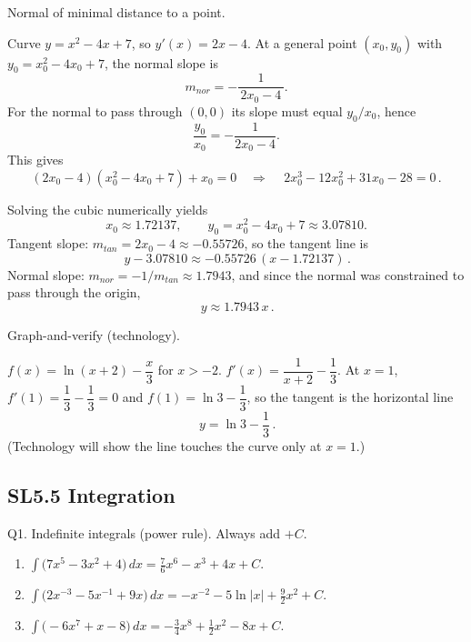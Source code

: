 \documentclass[11pt]{article}
\def\textbf#1{#1}%
\def\mathrm#1{#1}%
\newcommand{\tocsubsection}[1]{\subsection{#1}}
\begin{document}
\begin{solution}
\textbf{Normal of minimal distance to a point.}

Curve $y=x^2-4x+7$, so $y'(x)=2x-4$.  
At a general point $(x_0,y_0)$ with $y_0=x_0^2-4x_0+7$, the normal slope is
\[
m_{\mathrm{nor}}=-\frac{1}{\,2x_0-4\,}.
\]
For the normal to pass through $(0,0)$ its slope must equal $y_0/x_0$, hence
\[
\frac{y_0}{x_0}=-\frac{1}{2x_0-4}.
\]
This gives
\[
(2x_0-4)(x_0^2-4x_0+7)+x_0=0
\quad\Rightarrow\quad
\boxed{\,2x_0^3-12x_0^2+31x_0-28=0\,}.
\]

Solving the cubic numerically yields
\[
\boxed{x_0\approx 1.72137},\qquad
y_0=x_0^2-4x_0+7\approx \boxed{3.07810}.
\]
Tangent slope: $m_{\mathrm{tan}}=2x_0-4\approx -0.55726$, so the tangent line is
\[
\boxed{\,y-3.07810\approx -0.55726\,(x-1.72137)\,}.
\]
Normal slope: $m_{\mathrm{nor}}=-1/m_{\mathrm{tan}}\approx 1.7943$, and since the normal was constrained to pass through the origin,
\[
\boxed{\,y\approx 1.7943\,x\,}.
\]
\end{solution}

\begin{solution}
\textbf{Graph-and-verify (technology).}

$f(x)=\ln(x+2)-\dfrac{x}{3}$ for $x>-2$.  
$f'(x)=\dfrac{1}{x+2}-\dfrac{1}{3}$.  
At $x=1$, $f'(1)=\dfrac{1}{3}-\dfrac{1}{3}=0$ and $f(1)=\ln 3-\dfrac{1}{3}$,
so the tangent is the horizontal line
\[
\boxed{\,y=\ln 3-\dfrac{1}{3}\,}.
\]
(Technology will show the line touches the curve only at $x=1$.)
\end{solution}




\tocsubsection{SL5.5 Integration}


\begin{solution}
\textbf{Q1. Indefinite integrals (power rule).} Always add $+C$.
\begin{enumerate}
  \item $\displaystyle \int \big(7x^{5}-3x^{2}+4\big)\,dx
  = \frac{7}{6}x^{6}-x^{3}+4x + C.$
  \item $\displaystyle \int \big(2x^{-3}-5x^{-1}+9x\big)\,dx
  = -x^{-2}-5\ln|x|+\frac{9}{2}x^{2}+C.$
  \item $\displaystyle \int \big(-6x^{7}+x-8\big)\,dx
  = -\frac{3}{4}x^{8}+\frac{1}{2}x^{2}-8x + C.$
\end{enumerate}
\end{solution}
\end{document}
